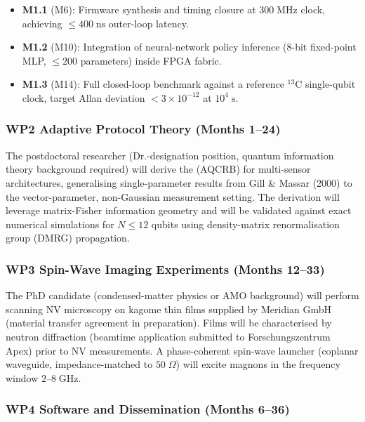 \begin{itemize}[leftmargin=*,itemsep=2pt]
  \item \textbf{M1.1} (M6): Firmware synthesis and timing closure at $300\;\text{MHz}$
        clock, achieving $\leq400\;\text{ns}$ outer-loop latency.
  \item \textbf{M1.2} (M10): Integration of neural-network policy inference
        (8-bit fixed-point MLP, $\leq200$ parameters) inside FPGA fabric.
  \item \textbf{M1.3} (M14): Full closed-loop benchmark against a reference $^{13}$C
        single-qubit clock, target Allan deviation $<3\times10^{-12}$ at $10^4\;\text{s}$.
\end{itemize}

\subsubsection*{WP2 \textemdash{} Adaptive Protocol Theory (Months 1--24)}

The postdoctoral researcher (Dr.-designation position, quantum information theory
background required) will derive the 
(AQCRB) for multi-sensor architectures, generalising single-parameter results from
Gill \& Massar (2000) to the vector-parameter, non-Gaussian measurement setting. The
derivation will leverage matrix-Fisher information geometry and will be validated
against exact numerical simulations for $N\leq12$ qubits using density-matrix
renormalisation group (DMRG) propagation.

\subsubsection*{WP3 \textemdash{} Spin-Wave Imaging Experiments (Months 12--33)}

The PhD candidate (condensed-matter physics or AMO background) will perform scanning NV
microscopy on kagome thin films supplied by Meridian GmbH (material transfer
agreement in preparation). Films will be characterised by neutron diffraction (beamtime
application submitted to Forschungszentrum Apex) prior to NV measurements. A
phase-coherent spin-wave launcher (coplanar waveguide, impedance-matched to $50\;\Omega$)
will excite magnons in the frequency window $2$--$8\;\text{GHz}$.

\subsubsection*{WP4 \textemdash{} Software and Dissemination (Months 6--36)}

